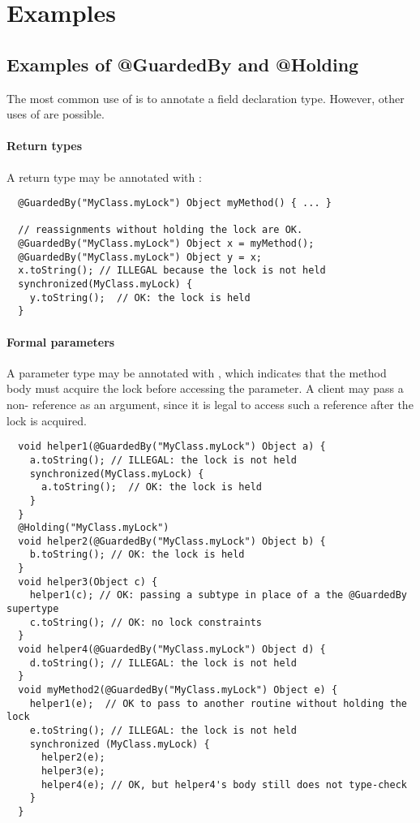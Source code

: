 \section{Examples\label{lock-examples}}

\subsection{Examples of @GuardedBy and @Holding\label{lock-examples-guardedby-and-holding}}

The most common use of  is to annotate a field declaration
type.  However, other uses of  are possible.

\paragraph{Return types\label{lock-examples-guardedby-return}}

A return type may be annotated with :

\begin{Verbatim}
  @GuardedBy("MyClass.myLock") Object myMethod() { ... }

  // reassignments without holding the lock are OK.
  @GuardedBy("MyClass.myLock") Object x = myMethod();
  @GuardedBy("MyClass.myLock") Object y = x;
  x.toString(); // ILLEGAL because the lock is not held
  synchronized(MyClass.myLock) {
    y.toString();  // OK: the lock is held
  }
\end{Verbatim}

\paragraph{Formal parameters\label{lock-examples-guardedby-formal-parameters}}

A parameter type may be annotated with , which indicates that
the method body must acquire the lock before accessing the parameter.  A
client may pass a non- reference as an argument, since it
is legal to access such a reference after the lock is acquired.

\begin{Verbatim}
  void helper1(@GuardedBy("MyClass.myLock") Object a) {
    a.toString(); // ILLEGAL: the lock is not held
    synchronized(MyClass.myLock) {
      a.toString();  // OK: the lock is held
    }
  }
  @Holding("MyClass.myLock")
  void helper2(@GuardedBy("MyClass.myLock") Object b) {
    b.toString(); // OK: the lock is held
  }
  void helper3(Object c) {
    helper1(c); // OK: passing a subtype in place of a the @GuardedBy supertype
    c.toString(); // OK: no lock constraints
  }
  void helper4(@GuardedBy("MyClass.myLock") Object d) {
    d.toString(); // ILLEGAL: the lock is not held
  }
  void myMethod2(@GuardedBy("MyClass.myLock") Object e) {
    helper1(e);  // OK to pass to another routine without holding the lock
    e.toString(); // ILLEGAL: the lock is not held
    synchronized (MyClass.myLock) {
      helper2(e);
      helper3(e);
      helper4(e); // OK, but helper4's body still does not type-check
    }
  }
\end{Verbatim}

